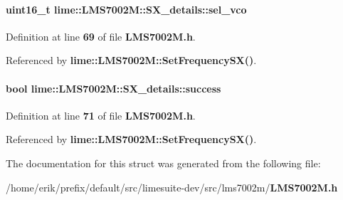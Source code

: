 \paragraph[{sel\+\_\+vco}]{\setlength{\rightskip}{0pt plus 5cm}uint16\+\_\+t lime\+::\+L\+M\+S7002\+M\+::\+S\+X\+\_\+details\+::sel\+\_\+vco}\label{structlime_1_1LMS7002M_1_1SX__details_a8b709540f788b0ec716de3ee11a6040a}


Definition at line {\bf 69} of file {\bf L\+M\+S7002\+M.\+h}.



Referenced by {\bf lime\+::\+L\+M\+S7002\+M\+::\+Set\+Frequency\+S\+X()}.

\paragraph[{success}]{\setlength{\rightskip}{0pt plus 5cm}bool lime\+::\+L\+M\+S7002\+M\+::\+S\+X\+\_\+details\+::success}\label{structlime_1_1LMS7002M_1_1SX__details_a03edb5325cc2dd7772ab3f70ed4bc8e2}


Definition at line {\bf 71} of file {\bf L\+M\+S7002\+M.\+h}.



Referenced by {\bf lime\+::\+L\+M\+S7002\+M\+::\+Set\+Frequency\+S\+X()}.



The documentation for this struct was generated from the following file\+:\begin{DoxyCompactItemize}
\item 
/home/erik/prefix/default/src/limesuite-\/dev/src/lms7002m/{\bf L\+M\+S7002\+M.\+h}\end{DoxyCompactItemize}
